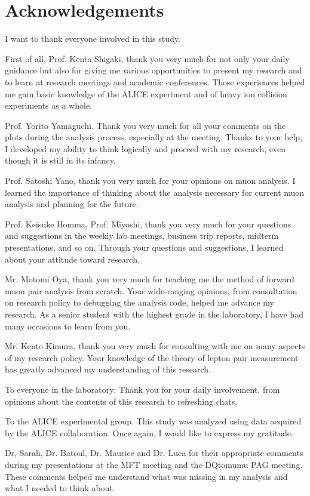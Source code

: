 \newpage
\section{Acknowledgements}
I want to thank everyone involved in this study.

First of all, Prof. Kenta Shigaki, thank you very much for not only your daily guidance but also for giving me various opportunities to present my research and to learn at research meetings and academic conferences. Those experiences helped me gain basic knowledge of the ALICE experiment and of heavy ion collision experiments as a whole.

Prof. Yorito Yamaguchi. Thank you very much for all your comments on the plots during the analysis process, especially at the meeting. Thanks to your help, I developed my ability to think logically and proceed with my research, even though it is still in its infancy.

Prof. Satoshi Yano, thank you very much for your opinions on muon analysis. I learned the importance of thinking about the analysis necessary for current muon analysis and planning for the future.

Prof. Keisuke Homma, Prof. Miyoshi, thank you very much for your questions and suggestions in the weekly lab meetings, business trip reports, midterm presentations, and so on. Through your questions and suggestions, I learned about your attitude toward research.

Mr. Motomi Oya, thank you very much for teaching me the method of forward muon pair analysis from scratch. Your wide-ranging opinions, from consultation on research policy to debugging the analysis code, helped me advance my research. As a senior student with the highest grade in the laboratory, I have had many occasions to learn from you.

Mr. Kento Kimura, thank you very much for consulting with me on many aspects of my research policy. Your knowledge of the theory of lepton pair measurement has greatly advanced my understanding of this research.

To everyone in the laboratory: Thank you for your daily involvement, from opinions about the contents of this research to refreshing chats.

To the ALICE experimental group.
This study was analyzed using data acquired by the ALICE collaboration. Once again, I would like to express my gratitude.

Dr, Sarah, Dr. Batoul, Dr. Maurice and Dr. Luca for their appropriate comments during my presentations at the MFT meeting and the DQtomumu PAG meeting. These comments helped me understand what was missing in my analysis and what I needed to think about.
